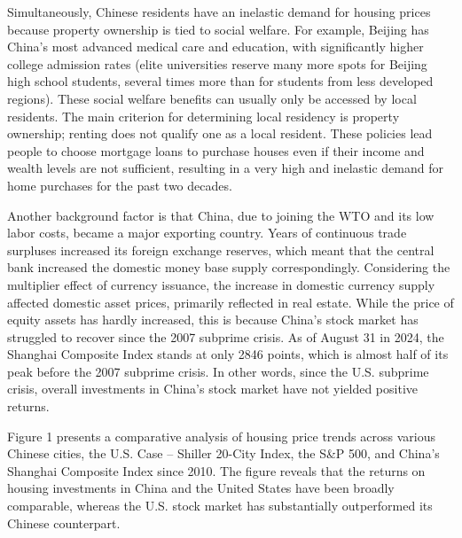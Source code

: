 \documentclass[12pt,english]{article}
\begin{document}
	Simultaneously, Chinese residents have an inelastic demand for housing prices because property ownership is tied to social welfare. For example, Beijing has China's most advanced medical care and education, with significantly higher college admission rates (elite universities reserve many more spots for Beijing high school students, several times more than for students from less developed regions). These social welfare benefits can usually only be accessed by local residents. The main criterion for determining local residency is property ownership; renting does not qualify one as a local resident. These policies lead people to choose mortgage loans to purchase houses even if their income and wealth levels are not sufficient, resulting in a very high and inelastic demand for home purchases for the past two decades.
	
	Another background factor is that China, due to joining the WTO and its low labor costs, became a major exporting country. Years of continuous trade surpluses increased its foreign exchange reserves, which meant that the central bank increased the domestic money base supply correspondingly. Considering the multiplier effect of currency issuance, the increase in domestic currency supply affected domestic asset prices, primarily reflected in real estate. While the price of equity assets has hardly increased, this is because China's stock market has struggled to recover since the 2007 subprime crisis. As of August 31 in 2024, the Shanghai Composite Index stands at only 2846 points, which is almost half of its peak before the 2007 subprime crisis. In other words, since the U.S. subprime crisis, overall investments in China's stock market have not yielded positive returns.
	
	Figure 1 presents a comparative analysis of housing price trends across various Chinese cities, the U.S. Case -- Shiller 20-City Index, the S\&P 500, and China’s Shanghai Composite Index since 2010. The figure reveals that the returns on housing investments in China and the United States have been broadly comparable, whereas the U.S. stock market has substantially outperformed its Chinese counterpart.
	
\end{document}
